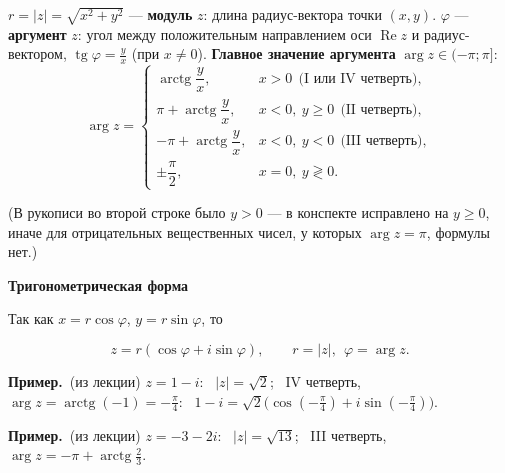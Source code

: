 \documentclass[a4paper,11pt]{article}
\DeclareMathOperator{\Rez}{Re}
\DeclareMathOperator{\Imz}{Im}
\newcommand{\prim}{\par\smallskip\noindent\textbf{\textcolor{teoc!80!black}{Пример.}}\ }
\newcommand{\podr}[1]{\par\needspace{8\baselineskip}\medskip
  {\large\bfseries\textcolor{oprc!80!black}{#1}}\par\nopagebreak\smallskip}
\begin{document}
\begin{center}
\end{center}

\begin{opr}
$r = |z| = \sqrt{x^2 + y^2}$ --- \textbf{модуль} $z$: длина радиус-вектора точки $(x, y)$.
$\varphi$ --- \textbf{аргумент} $z$: угол между положительным направлением оси $\Rez z$ и радиус-вектором,
$\operatorname{tg}\varphi = \frac yx$ (при $x \ne 0$). \textbf{Главное значение аргумента} $\arg z \in (-\pi; \pi]$:
\[
  \arg z = \begin{cases}
    \operatorname{arctg}\dfrac yx, & x > 0 \ \ \text{(I или IV четверть)}, \\[4pt]
    \pi + \operatorname{arctg}\dfrac yx, & x < 0,\ y \ge 0 \ \ \text{(II четверть)}, \\[4pt]
    -\pi + \operatorname{arctg}\dfrac yx, & x < 0,\ y < 0 \ \ \text{(III четверть)}, \\[4pt]
    \pm\dfrac\pi2, & x = 0,\ y \gtrless 0.
  \end{cases}
\]
\end{opr}

{\small\textcolor{zamc}{(В рукописи во второй строке было $y > 0$ --- в конспекте исправлено на $y \ge 0$, иначе для отрицательных
вещественных чисел, у которых $\arg z = \pi$, формулы нет.)}}

\podr{Тригонометрическая форма}

Так как $x = r\cos\varphi$, $y = r\sin\varphi$, то
\begin{opr}
\[
  z = r(\cos\varphi + i\sin\varphi), \qquad r = |z|, \ \ \varphi = \arg z.
\]
\end{opr}

\prim (из лекции) $z = 1 - i$: \ $|z| = \sqrt2$; \ IV четверть, $\arg z = \operatorname{arctg}(-1) = -\frac\pi4$:
\ $1 - i = \sqrt2\bigl(\cos(-\frac\pi4) + i\sin(-\frac\pi4)\bigr)$.

\prim (из лекции) $z = -3 - 2i$: \ $|z| = \sqrt{13}$; \ III четверть, $\arg z = -\pi + \operatorname{arctg}\frac23$.
\end{document}
